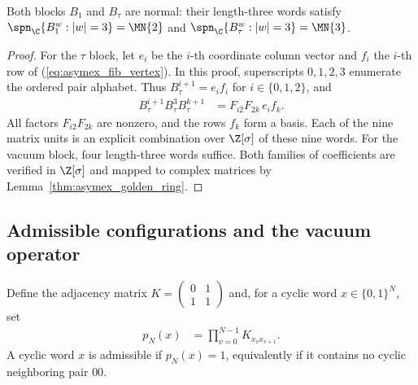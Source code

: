 \begin{lemma}
    \label{thm:asymex_fib_normal}
    \leanok
    Both blocks $B_1$ and $B_\tau$ are normal: their length-three words
    satisfy $\spn_{\C}\{B_1^w : |w|=3\} = \MN{2}$ and
    $\spn_{\C}\{B_\tau^w : |w|=3\} = \MN{3}$.
\end{lemma}

\begin{proof}
    \leanok
    For the $\tau$ block, let $e_i$ be the $i$-th coordinate column
    vector and $f_i$ the $i$-th row of
    (\ref{eq:asymex_fib_vertex}). In this proof, superscripts
    $0,1,2,3$ enumerate the ordered pair alphabet. Thus
    $B_\tau^{i+1}=e_i f_i$ for $i\in\{0,1,2\}$, and
    \begin{align}
        B_\tau^{i+1}B_\tau^3B_\tau^{k+1}
         & =F_{i2}F_{2k}\,e_i f_k.
    \end{align}
    All factors $F_{i2}F_{2k}$ are nonzero, and the rows $f_k$
    form a basis. Each of the nine matrix units is an explicit
    combination over $\Z[\sigma]$ of these nine words.
    For the vacuum block, four length-three words suffice.
    Both families of coefficients are verified in $\Z[\sigma]$
    and mapped to complex matrices by
    Lemma~\ref{thm:asymex_golden_ring}.
\end{proof}

\subsection{Admissible configurations and the vacuum operator}

Define the adjacency matrix $K=\begin{pmatrix}0&1\\1&1\end{pmatrix}$
and, for a cyclic word $x\in\{0,1\}^N$, set
\begin{align}
    p_N(x) & =\prod_{v=0}^{N-1}K_{x_vx_{v+1}}.
    \label{eq:asymex_fib_admissibility}
\end{align}
A cyclic word $x$ is admissible if $p_N(x)=1$, equivalently if it contains no
cyclic neighboring pair $00$.

